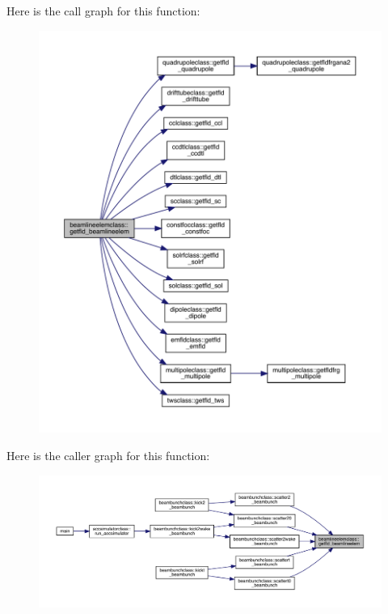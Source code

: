 Here is the call graph for this function\+:\nopagebreak
\begin{figure}[H]
\begin{center}
\leavevmode
\includegraphics[width=350pt]{namespacebeamlineelemclass_a21fd373bab34a4c18c8bcf5b00816c0c_cgraph}
\end{center}
\end{figure}
Here is the caller graph for this function\+:\nopagebreak
\begin{figure}[H]
\begin{center}
\leavevmode
\includegraphics[width=350pt]{namespacebeamlineelemclass_a21fd373bab34a4c18c8bcf5b00816c0c_icgraph}
\end{center}
\end{figure}
\mbox{\label{namespacebeamlineelemclass_aa711cecfd3c01152cb0d88d88b645c4b}} 
